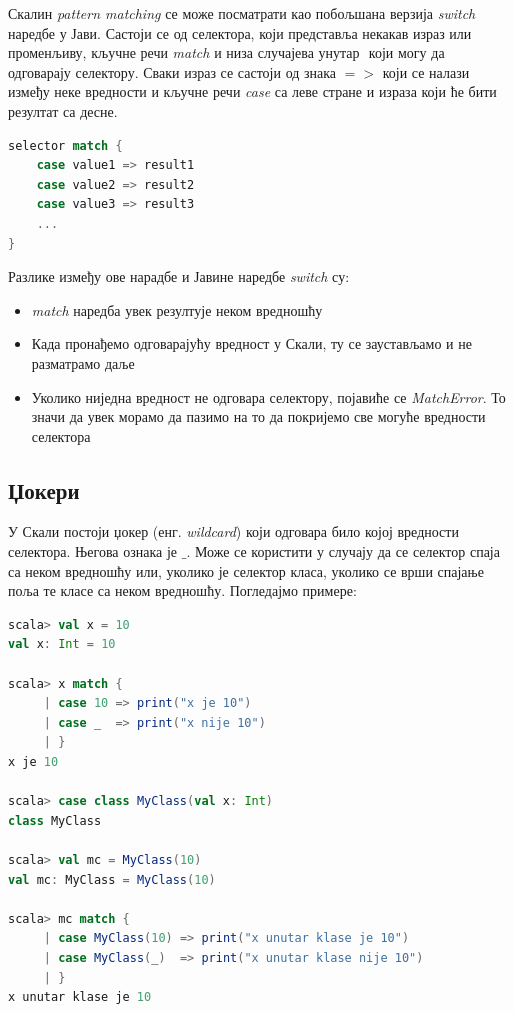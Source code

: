 \documentclass[12pt,oneside]{memoir}
\begin{document}
Скалин \textit{pattern matching} се може посматрати као побољшана верзија \textit{switch} наредбе у Јави. Састоји се од селектора, који представља некакав израз или променљиву, кључне речи \textit{match} и низа случајева унутар ${}$ који могу да одговарају селектору. Сваки израз се састоји од знака $=>$ који се налази између неке вредности и кључне речи \textit{case} са леве стране и израза који ће бити резултат са десне. \cite{scala_prog}

\begin{lstlisting}[language=Scala]
selector match {
	case value1 => result1
	case value2 => result2
	case value3 => result3
	...
}
\end{lstlisting}

Разлике између ове нарадбе и Јавине наредбе \textit{switch} су:

\begin{itemize}
\item \textit{match} наредба увек резултује неком вредношћу
\item Када пронађемо одговарајућу вредност у Скали, ту се заустављамо и не разматрамо даље
\item Уколико ниједна вредност не одговара селектору, појавиће се \textit{MatchError}. То значи да увек морамо да пазимо на то да покријемо све могуће вредности селектора
\end{itemize}

\subsection{Џокери}
\label{subsec:scala_match_wildcard}

У Скали постоји џокер (енг. \textit{wildcard}) који одговара било којој вредности селектора. Његова ознака је $\_$. Може се користити у случају да се селектор спаја са неком вредношћу или, уколико је селектор класа, уколико се врши спајање поља те класе са неком вредношћу. Погледајмо примере: \cite{scala_prog}

\begin{lstlisting}[language=Scala]
scala> val x = 10
val x: Int = 10

scala> x match {
     | case 10 => print("x je 10")
     | case _  => print("x nije 10")
     | }
x je 10

scala> case class MyClass(val x: Int)
class MyClass

scala> val mc = MyClass(10)
val mc: MyClass = MyClass(10)

scala> mc match {
     | case MyClass(10) => print("x unutar klase je 10")
     | case MyClass(_)  => print("x unutar klase nije 10")
     | }
x unutar klase je 10
\end{lstlisting}
\end{document}
